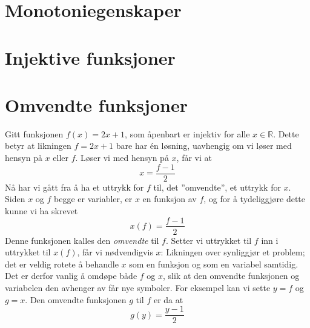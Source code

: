 





\section{Monotoniegenskaper}
	
\section{Injektive funksjoner}

\section{Omvendte funksjoner}
Gitt funksjonen $ f(x)=2x+1 $, som åpenbart er injektiv for alle $ x\in \mathbb{R} $. Dette betyr at likningen $ f=2x+1 $ bare har én løsning, uavhengig om vi løser med hensyn på $ x $ eller $ f $. Løser vi med hensyn på $ x $, får vi at
\[ x=\frac{f-1}{2} \]
Nå har vi gått fra å ha et uttrykk for $ f $ til, det ''omvendte'', et uttrykk for $ x $. Siden $ x $ og $ f $ begge er variabler, er $ x $ en funksjon av $ f $, og for å tydeliggjøre dette kunne vi ha skrevet
\[ x(f)=\frac{f-1}{2} \]
Denne funksjonen kalles den \textit{omvendte} til $ f $. Setter vi uttrykket til $ f $ inn i uttrykket til $ x(f) $, får vi nødvendigvis $ x $:
Likningen over synliggjør et problem; det er veldig rotete å behandle $ x $ som en funksjon og som en variabel samtidig. Det er derfor vanlig å omdøpe både $ f $ og $ x $, slik at den omvendte funksjonen og variabelen den avhenger av får nye symboler. For eksempel kan vi sette $ y=f$ og $ g=x $. Den omvendte funksjonen $ g $ til $ f $ er da at
\[ g(y)=\frac{y-1}{2} \]
 \newpage
{}
\newpage
{}

